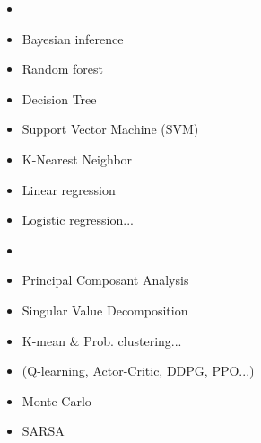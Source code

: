 \documentclass[10pt,serif,mathserif,compress,hyperref={colorlinks}]{beamer}
\begin{document}
\begin{frame}{}

  
  \begin{tcolorbox}[title=Various approaches for ML algorithms]
    {\small
      \begin{minipage}[t]{.55\textwidth}
        \begin{itemize}
        \item<1-> 
        \item<1> Bayesian inference
        \item<1> Random forest
        \item<1> Decision Tree
        \item<1> Support Vector Machine (SVM)
        \item<1> K-Nearest Neighbor
        \item<1> Linear regression
        \item<1> Logistic regression...
        \end{itemize}
      \end{minipage}\begin{minipage}[t]{.55\textwidth}
        \begin{itemize}
        \item<1-> 
        \item<1> Principal Composant Analysis
        \item<1> Singular Value Decomposition
        \item<1> K-mean \& Prob. clustering...
        \end{itemize}
        \medskip
        \begin{itemize}
        \item<1-> (Q-learning, Actor-Critic, DDPG, PPO...)
        \item<1> Monte Carlo
        \item<1> SARSA
        \end{itemize}
        
      \end{minipage}
    }
  \end{tcolorbox}    
\end{frame}
\end{document}
